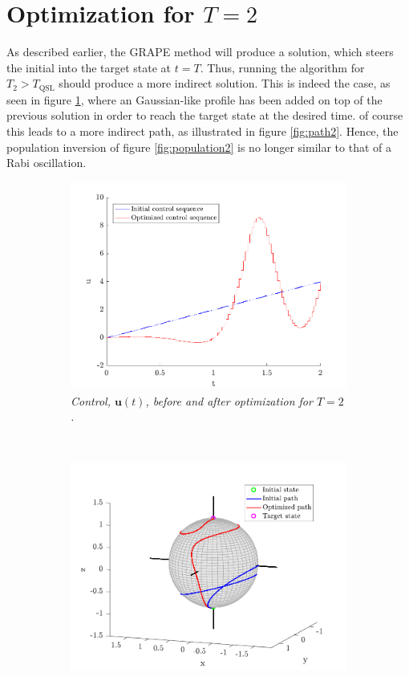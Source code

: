 \section{Optimization for $T = 2$ } 
As described earlier, the GRAPE method will produce a solution, which steers the initial into the target state at $t = T$. Thus, running the algorithm for $T_2 > T_{\mathrm{QSL}}$ should produce a more indirect solution.
This is indeed the case, as seen in figure \ref{fig:control2}, where an Gaussian-like profile has been added on top of the previous solution in order to reach the target state at the desired time. of course this leads to a more indirect path, as illustrated in figure \ref{fig:path2}. Hence, the population inversion of figure \ref{fig:population2} is no longer similar to that of a Rabi oscillation.
\begin{figure}[h!]
    \centering
    \begin{subfigure}[t]{0.49\textwidth}
        \includegraphics[width=\textwidth]{Figures/control2.pdf}
        \caption{\textit{Control, $\boldsymbol{u}(t)$, before and after optimization for $T = 2$.}}
        \label{fig:control2}
    \end{subfigure}
    ~
    \begin{subfigure}[t]{0.49\textwidth}
        \includegraphics[width=\textwidth]{Figures/path2.pdf}

\end{subfigure}
\end{figure}

